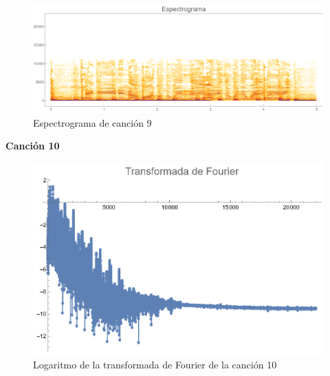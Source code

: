 \documentclass[12pt, letterpaper]{article}
\begin{document}
\begin{figure}[H]
  \centering
  \includegraphics[width=.9\linewidth]{imgs/Cancion9/espectrograma.png}
  \caption{Espectrograma de canción 9}
  \label{fig:09i}
\end{figure}

\textbf{\large{Canción 10}}
\begin{figure}[H]
  \centering
  \includegraphics[width=0.7\linewidth]{imgs/Cancion10/transformada.png}
  \caption{Logaritmo de la transformada de Fourier de la canción 10}
  \label{fig:10a}
\end{figure}
\end{document}
